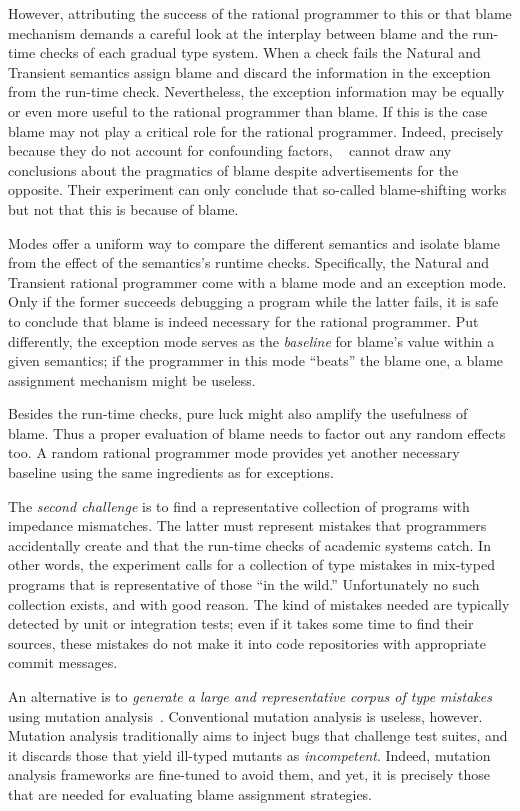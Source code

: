 However, attributing the success of the rational programmer to this or
that blame mechanism demands a careful look at the interplay between blame
and the run-time checks of each gradual type system. When a check fails
the Natural and Transient semantics assign blame and discard  the
information in the exception from the run-time check. Nevertheless, the
exception information may be equally or even more useful to the rational
programmer than blame. If this is the case blame may not play a critical
role for the rational programmer. Indeed, precisely because they do not
account for confounding factors, ~\citet{lksfd-popl-2020} cannot draw any
conclusions about the pragmatics of blame despite advertisements for the
opposite. Their experiment can only conclude that so-called blame-shifting
works but not that this is because of blame. 

Modes offer a uniform way to compare the different semantics and  isolate
blame from the effect of the semantics's runtime checks. Specifically, the Natural and
Transient rational programmer come with a blame mode and an exception
mode. Only if the former succeeds debugging a program while the latter
fails, it is safe to conclude that blame is indeed necessary for the
rational programmer. Put differently, the exception mode serves as the
{\em baseline\/} for blame's value within a given semantics; if the
programmer in this mode ``beats'' the  blame one, a blame assignment
mechanism might be useless.

Besides the run-time checks, pure luck might also amplify the usefulness
of blame. Thus a proper evaluation of blame needs to factor out any random
effects too. A random rational programmer mode provides yet another necessary
baseline using the same ingredients as for exceptions. 

The {\em second challenge\/} is to find a representative collection of
programs with impedance mismatches. The latter must represent mistakes that programmers
accidentally create and that the run-time checks of academic systems catch. In
other words, the experiment calls for a collection of type mistakes in
mix-typed programs that is representative of those ``in the wild.''
Unfortunately no such collection exists, and with good reason. The kind of
mistakes needed are typically detected by unit or integration tests; even if it
takes some time to find their sources, these mistakes do not make it into code
repositories with appropriate commit messages.

An alternative is to {\em generate a large and representative corpus of type
mistakes \/} using mutation analysis~\cite{lipton1971fault, demillo1978hints,
jia2011analysis}. Conventional mutation analysis is useless, however.  Mutation
analysis traditionally aims to inject bugs that challenge test suites, and it
discards those that yield ill-typed mutants as \emph{incompetent}. Indeed,
mutation analysis frameworks are fine-tuned to avoid them, and yet, it is
precisely those that are needed for evaluating blame assignment strategies.

